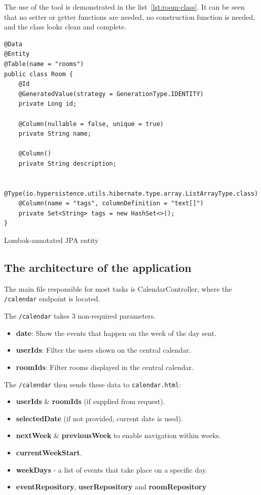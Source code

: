 The use of the tool is demonstrated in the list~\ref{lst:room-class}.
It can be seen that no setter or getter functions are needed, no construction function is needed, and the class looks clean and complete.


\begin{listing}[H]
\begin{verbatim}
@Data
@Entity
@Table(name = "rooms")
public class Room {
    @Id
    @GeneratedValue(strategy = GenerationType.IDENTITY)
    private Long id;

    @Column(nullable = false, unique = true)
    private String name;

    @Column()
    private String description;

    @Type(io.hypersistence.utils.hibernate.type.array.ListArrayType.class)
    @Column(name = "tags", columnDefinition = "text[]")
    private Set<String> tags = new HashSet<>();
}
\end{verbatim}
\caption{Lombok-annotated JPA entity}
\label{lst:room-class}
\end{listing}


\newpage%

\subsection{The architecture of the application}\label{subsec:the-architecture-of-the-application}

The main file responsible for most tasks is CalendarController, where the \texttt{/calendar} endpoint is located.

The \texttt{/calendar} takes 3 non-required parameters.
\begin{itemize}
    \item \textbf{date}: Show the events that happen on the week of the day sent.
    \item \textbf{userIds}: Filter the users shown on the central calendar.
    \item \textbf{roomIds}: Filter rooms displayed in the central calendar.
\end{itemize}

The \texttt{/calendar} then sends these data to \texttt{calendar.html}:
\begin{itemize}
    \item \textbf{userIds} \& \textbf{roomIds} (if supplied from request).
    \item \textbf{selectedDate} (if not provided, current date is used).
    \item \textbf{nextWeek} \& \textbf{previousWeek} to enable navigation within weeks.
    \item \textbf{currentWeekStart}.
    \item \textbf{weekDays} - a list of events that take place on a specific day.
    \item \textbf{eventRepository}, \textbf{userRepository} and \textbf{roomRepository}
\end{itemize}


